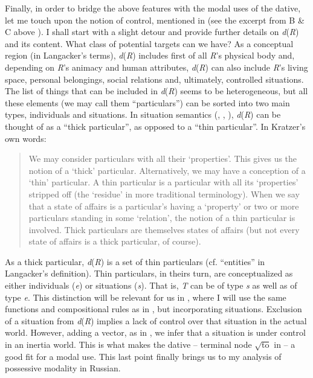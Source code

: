 \documentclass[output=paper,colorlinks,citecolor=brown,nonflat]{./langscibook}
\begin{document}
Finally, in order to bridge the above features with the modal uses of the dative, let me touch upon the notion of control, mentioned in  (see the excerpt from B \& C above ). I shall start with a slight detour and provide further details on \textit{d}(\textit{R}) and its content. What class of potential targets can we have? As a conceptual region (in Langacker’s terms), \textit{d}(\textit{R}) includes first of all \textit{R}’s physical body and, depending on \textit{R}’s animacy and human attributes, \textit{d}(\textit{R}) can also include \textit{R}’s living space, personal belongings, social relations and, ultimately, controlled situations. The list of things that can be included in \textit{d}(\textit{R}) seems to be heterogeneous, but all these elements (we may call them “particulars”) can be sorted into two main types, individuals and situations. In situation semantics (\citealt{Kratzer1989}, \citeyear{Kratzer2002}, \citeyear{Kratzer2007}), \textit{d}(\textit{R}) can be thought of as a “thick particular”, as opposed to a “thin particular”. In Kratzer’s own words: 

\begin{quote}
We may consider particulars with all their ‘properties’. This gives us the notion of a ‘thick’ particular. Alternatively, we may have a conception of a ‘thin’ particular. A thin particular is a particular with all its ‘properties’ stripped off (the ‘residue’ in more traditional terminology). When we say that a state of affairs is a particular’s having a ‘property’ or two or more particulars standing in some ‘relation’, the notion of a thin particular is involved. Thick particulars are themselves states of affairs (but not every state of affairs is a thick particular, of course). \hfill \citep[613]{Kratzer1989} 
\end{quote}

As a thick particular, \textit{d}(\textit{R}) is a set of thin particulars (cf. “entities” in Langacker’s definition). Thin particulars, in theirs turn, are conceptualized as either individuals (\textit{e}) or situations (\textit{s}). That is, \textit{T} can be of type \textit{s} as well as of type \textit{e}. This distinction will be relevant for us in , where I will use the same functions and compositional rules as in , but incorporating situations. Exclusion of a situation from \textit{d}(\textit{R}) implies a lack of control over that situation in the actual world. However, adding a vector, as in , we infer that a situation is under control in an inertia world. This is what makes the dative – terminal node  $\sqrt{\text{to}}$  in  – a good fit for a modal use. This last point finally brings us to my analysis of possessive modality in Russian.
\end{document}
